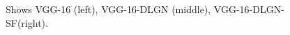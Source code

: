 \begin{figure}
\centering
\begin{minipage}{0.3\columnwidth}
\resizebox{!}{20cm}{

}
\end{minipage}
\begin{minipage}{0.3\columnwidth}
\resizebox{!}{20cm}{

}
\end{minipage}
\begin{minipage}{0.3\columnwidth}
\resizebox{!}{20cm}{

}
\end{minipage}
\caption{Shows VGG-16 (left), VGG-16-DLGN (middle), VGG-16-DLGN-SF(right).}
\label{fig:vggnets}

\end{figure}
